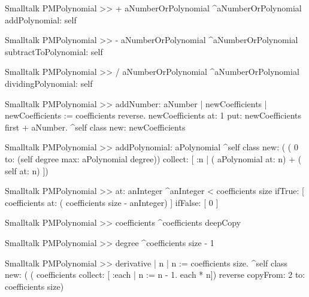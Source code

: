 \begin{displaycode}{Smalltalk}
PMPolynomial >> + aNumberOrPolynomial
    ^aNumberOrPolynomial addPolynomial: self
\end{displaycode}

\begin{displaycode}{Smalltalk}
PMPolynomial >> - aNumberOrPolynomial
    ^aNumberOrPolynomial subtractToPolynomial: self
\end{displaycode}

\begin{displaycode}{Smalltalk}
PMPolynomial >> / aNumberOrPolynomial
    ^aNumberOrPolynomial dividingPolynomial: self
\end{displaycode}

\begin{displaycode}{Smalltalk}
PMPolynomial >> addNumber: aNumber
    | newCoefficients |
    newCoefficients := coefficients reverse.
    newCoefficients at: 1 put: newCoefficients first + aNumber.
    ^self class new: newCoefficients
\end{displaycode}

\begin{displaycode}{Smalltalk}
PMPolynomial >> addPolynomial: aPolynomial
    ^self class new: ( ( 0 to: (self degree max: aPolynomial degree)) 
                collect: [ :n | ( aPolynomial at: n) + ( self at: n) ])
\end{displaycode}

\begin{displaycode}{Smalltalk}
PMPolynomial >> at: anInteger
    ^anInteger < coefficients size
        ifTrue: [ coefficients at: ( coefficients size - anInteger) ]
        ifFalse: [ 0 ]
\end{displaycode}

\begin{displaycode}{Smalltalk}
PMPolynomial >> coefficients
    ^coefficients deepCopy
\end{displaycode}

\begin{displaycode}{Smalltalk}
PMPolynomial >> degree 
    ^coefficients size - 1
\end{displaycode}

\begin{displaycode}{Smalltalk}
PMPolynomial >> derivative
    | n |
    n := coefficients size.
    ^self class new: ( ( coefficients
         collect: [ :each | n := n - 1. each * n]) reverse copyFrom: 2 to: coefficients size)
\end{displaycode}

